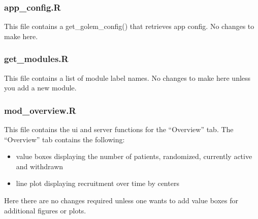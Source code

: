 \documentclass[]{article}
\providecommand{\tightlist}{%
  \setlength{\itemsep}{0pt}\setlength{\parskip}{0pt}}
\begin{document}
\hypertarget{app_config.r}{%
\subsubsection{app\_config.R}\label{app_config.r}}

This file contains a get\_golem\_config() that retrieves app config. No
changes to make here.

\hypertarget{get_modules.r}{%
\subsubsection{get\_modules.R}\label{get_modules.r}}

This file contains a list of module label names. No changes to make here
unless you add a new module.

\hypertarget{mod_overview.r}{%
\subsubsection{mod\_overview.R}\label{mod_overview.r}}

This file contains the ui and server functions for the ``Overview'' tab.
The ``Overview'' tab contains the following:

\begin{itemize}
\tightlist
\item
  value boxes displaying the number of patients, randomized, currently
  active and withdrawn
\item
  line plot displaying recruitment over time by centers
\end{itemize}

Here there are no changes required unless one wants to add value boxes
for additional figures or plots.
\end{document}
